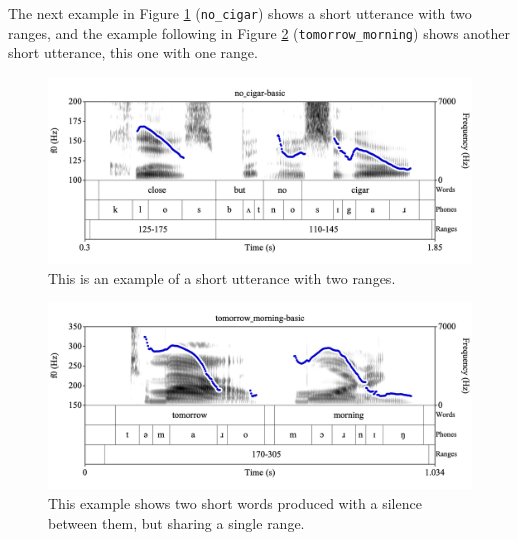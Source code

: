 \documentclass[11pt, twoside]{memoir}
\begin{document}
The next example in Figure \ref{fig:no_cigar Ranges basic} (\texttt{no\_cigar}) shows a short utterance with two ranges, and the example following in Figure \ref{fig:tomorrow_morning Ranges basic} (\texttt{tomorrow\_morning}) shows another short utterance, this one with one range.
\begin{figure}[H]
\centering
\includegraphics[width=.875\linewidth]{Ranges-no_cigar-basic.png}
\caption{This is an example of a short utterance with two ranges.
\label{fig:no_cigar Ranges basic}
}
\end{figure}
\begin{figure}[H]
\centering
\includegraphics[width=.875\linewidth]{Ranges-tomorrow_morning-basic.png}
\caption{This example shows two short words produced with a silence between them, but sharing a single range.
\label{fig:tomorrow_morning Ranges basic}
}
\end{figure}
\end{document}
